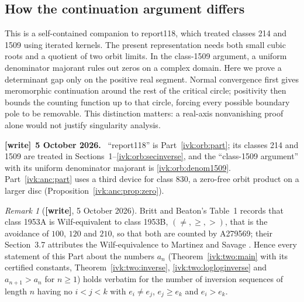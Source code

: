 \documentclass[11pt,letterpaper]{article}
\theoremstyle{remark}\newtheorem{remark}[theorem]{Remark}
\newenvironment{writenote}[1][]{\par\smallskip\begingroup\small
 \noindent\textbf{[write]}\if\relax\detokenize{#1}\relax\else~\textbf{#1.}\fi\ }%
 {\par\endgroup\smallskip}
\newcommand{\wtag}{\textup{\textbf{[write]}}}
\begin{document}
\subsection{How the continuation argument differs}\label{ivk:two:sec:contrast}
This is a self-contained companion to report118, which treated
classes 214 and 1509 using iterated kernels. The present representation
needs both small cubic roots and a quotient of two orbit limits.
In the class-1509 argument, a uniform denominator majorant rules out
zeros on a complex domain. Here we prove a determinant gap only on the
positive real segment. Normal convergence first gives meromorphic
continuation around the rest of the critical circle; positivity then
bounds the counting function up to that circle, forcing every possible
boundary pole to be removable. This distinction matters: a real-axis
nonvanishing proof alone would not justify singularity analysis.
\begin{writenote}[5 October 2026]
``report118'' is Part~\ref{ivk:orb:part}; its classes 214 and 1509 are treated in Sections~1--\ref{ivk:orb:secinverse}, and the ``class-1509 argument'' with its uniform denominator majorant is \eqref{ivk:orb:denom1509}. Part~\ref{ivk:anc:part} uses a third device for class 830, a zero-free orbit product on a larger disc (Proposition~\ref{ivk:anc:prop:zero}).
\end{writenote}
\begin{remark}[\wtag, 5 October 2026]\label{ivk:two:rem:wilf}
Britt and Beaton's Table~1 \cite{bb} records that class 1953A is Wilf-equivalent to class 1953B, $(\ne,\ge,>)$, that is the avoidance of $100$, $120$ and $210$, so that both are counted by A279569; their Section~3.7 attributes the Wilf-equivalence to Martinez and Savage \cite{ms}. Hence every statement of this Part about the numbers $a_n$ (Theorem~\ref{ivk:two:main} with its certified constants, Theorem~\ref{ivk:two:inverse}, \eqref{ivk:two:logloginverse} and $a_{n+1}>a_n$ for $n\ge1$) holds verbatim for the number of inversion sequences of length $n$ having no $i<j<k$ with $e_i\ne e_j$, $e_j\ge e_k$ and $e_i>e_k$.
\end{remark}
\end{document}
